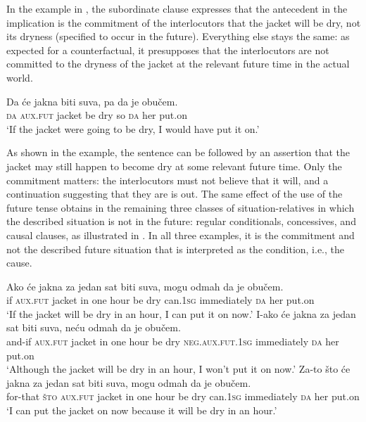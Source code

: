 \documentclass[output=paper,
colorlinks,
citecolor=brown,
newtxmath
]{langscibook}
\begin{document}
In the example in , the subordinate clause expresses that the antecedent in the implication is the commitment of the interlocutors that the jacket will be dry, not its dryness (specified to occur in the future). Everything else stays the same: as expected for a counterfactual, it presupposes that the interlocutors are not committed to the dryness of the jacket at the relevant future time in the actual world.

\ea\label{ex:Unreal-subj-verb}
\gll Da će jakna biti suva, pa da je obučem.\\
\textsc{da} \textsc{aux.fut} jacket be dry so \textsc{da} her put.on\\
\glt `If the jacket were going to be dry, I would have put it on.'
\z\z

\noindent As shown in the example, the sentence can be followed by an assertion that the jacket may still happen to become dry at some relevant future time. Only the commitment matters: the interlocutors must not believe that it will, and a continuation suggesting that they are is out.
The same effect of the use of the future tense obtains in the remaining three classes of situation-relatives in which the described situation is not in the future: regular conditionals, concessives, and causal clauses, as illustrated in . In all three examples, it is the commitment and not the described future situation that is interpreted as the condition, i.e., the cause.

\ea\label{ex:Future-verb}
\ea \gll Ako će jakna za jedan sat biti suva, mogu odmah da je obučem.\\
    if \textsc{aux.fut} jacket in one hour be dry can.\textsc{1sg} immediately \textsc{da} her put.on\\
    \glt `If the jacket will be dry in an hour, I can put it on now.'\label{ex:Future-verb-a}
\ex \gll I-ako će jakna za jedan sat biti suva, neću odmah da je obučem.\\
    and-if \textsc{aux.fut} jacket in one hour be dry \textsc{neg.aux.fut.1sg} immediately \textsc{da} her put.on\\
    \glt `Although the jacket will be dry in an hour, I won't put it on now.'\label{ex:Future-verb-b}
\ex \gll Za-to što će jakna za jedan sat biti suva, mogu odmah da je obučem.\\
    for-that \textsc{što} \textsc{aux.fut} jacket in one hour be dry can.\textsc{1sg} immediately \textsc{da} her put.on\\
    \glt `I can put the jacket on now because it will be dry in an hour.'\label{ex:Future-verb-c}
\z\z
\end{document}
